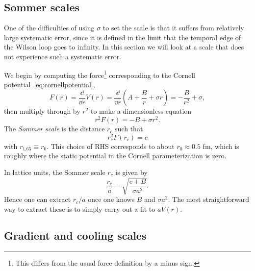 \subsection{Sommer scales}

One of the difficulties of using $\sigma$ to set the scale is that it suffers
from relatively large systematic error, since it is defined in the limit that
the temporal edge of the Wilson loop goes to infinity.
In this section we will look at a scale that does not experience such a
systematic error.

We begin by computing the force\footnote{This differs from the usual
force definition by a minus sign.} corresponding to the Cornell
potential~\eqref{eq:cornellpotential},
\begin{equation}
  F(r)=\frac{\dd}{\dd r}V(r)
      =\frac{\dd}{\dd r}\left(A+\frac{B}{r}+\sigma r\right)
      =-\frac{B}{r^2}+\sigma,
\end{equation}
then multiply through by $r^2$ to make a dimensionless equation
\begin{equation}
  r^2F(r)=-B+\sigma r^2.
\end{equation}
The {\it Sommer scale} is the distance $r_c$ such that
\begin{equation}
  r_c^2F(r_c)=c
\end{equation}
with $r_{1.65}\equiv r_0$. This choice of RHS corresponds to
about $r_0\approx 0.5$ fm, which is roughly where the static potential in the
Cornell parameterization is zero.

In lattice units, the Sommer scale $r_c$ is given by
\begin{equation}
  \frac{r_c}{a}=\sqrt{\frac{c+B}{\sigma a^2}}.
\end{equation}
Hence one can extract $r_c/a$ once one knows $B$ and $\sigma a^2$. The most
straightforward way to extract these is
to simply carry out a fit to $aV(r)$.

\subsection{Gradient and cooling scales}\label{sec:gradcool}


